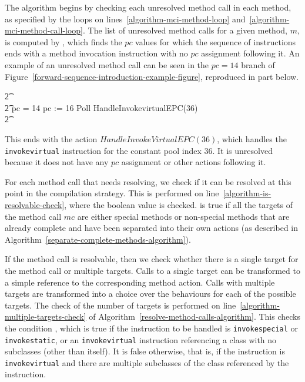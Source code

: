 The algorithm begins by checking each unresolved method call in each
method, as specified by the loops on
lines~\ref{algorithm-mci-method-loop}
and~\ref{algorithm-mci-method-call-loop}.
The list of unresolved method calls for a given method, $m$, is
computed by , which finds the $pc$
values for which the sequence of instructions ends with a method
invocation instruction with no $pc$ assignment following it.
An example of an unresolved method call can be seen in the $pc = 14$
branch of Figure~\ref{forward-sequence-introduction-example-figure},
reproduced in part below.
\begin{circusaction}
  \t2 {} \cdots {} \\
  \t2 {} \circelse pc = 14 \circthen \cdots \circseq pc := 16 \circseq Poll \circseq HandleInvokevirtualEPC(36) \\
  \t2 {} \cdots {}
\end{circusaction}
This ends with the action $HandleInvokeVirtualEPC(36)$, which handles
the \texttt{invokevirtual} instruction for the constant pool index
$36$.
It is unresolved because it does not have any $pc$ assignment or other
actions following it.

For each method call that needs resolving, we check if it can be
resolved at this point in the compilation strategy.
This is performed on line~\ref{algorithm-is-resolvable-check}, where
the boolean value  is checked.
 is true if all the targets of the method
call $mc$ are either special methods or non-special methods that are
already complete and have been separated into their own actions (as
described in Algorithm~\ref{separate-complete-methods-algorithm}).

If the method call is resolvable, then we check whether there is a
single target for the method call or multiple targets.
Calls to a single target can be transformed to a simple reference to
the corresponding method action.
Calls with multiple targets are transformed into a choice over the
behaviours for each of the possible targets.
The check of the number of targets is performed on
line~\ref{algorithm-multiple-targets-check} of
Algorithm~\ref{resolve-method-calls-algorithm}.
This checks the condition , which is true
if the instruction to be handled is \texttt{invokespecial} or
\texttt{invokestatic}, or an \texttt{invokevirtual} instruction
referencing a class with no subclasses (other than itself).
It is false otherwise, that is, if the instruction is
\texttt{invokevirtual} and there are multiple subclasses of the class
referenced by the instruction.

